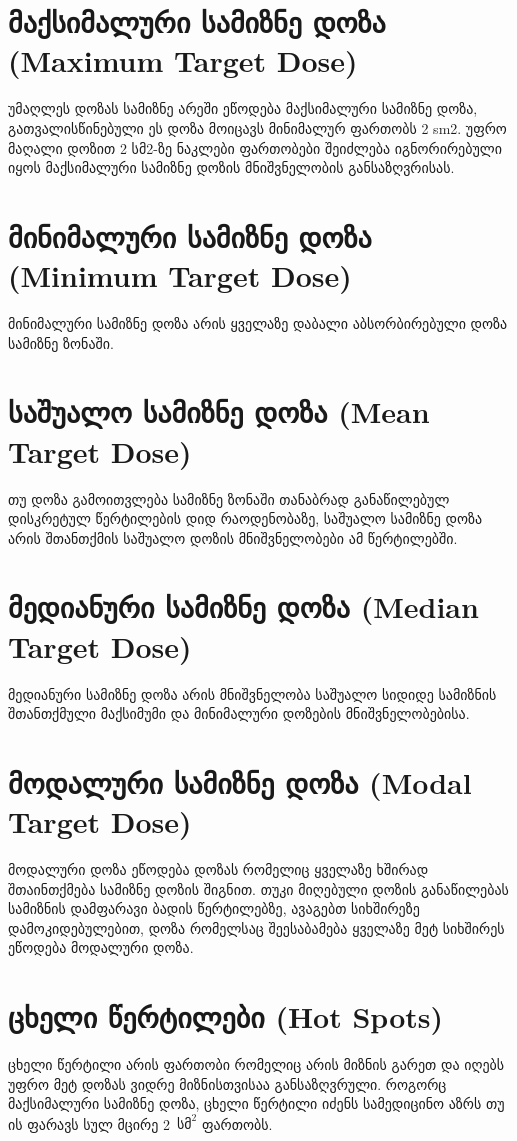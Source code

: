 \documentclass[12pt,a4paper,]{report}
\begin{document}
\section{მაქსიმალური სამიზნე დოზა (Maximum Target Dose)}
უმაღლეს დოზას სამიზნე არეში ეწოდება მაქსიმალური სამიზნე დოზა, გათვალისწინებული ეს დოზა მოიცავს მინიმალურ ფართობს 2 sm2. უფრო მაღალი დოზით 2 სმ2-ზე ნაკლები ფართობები შეიძლება იგნორირებული იყოს მაქსიმალური სამიზნე დოზის მნიშვნელობის განსაზღვრისას.

\section{მინიმალური სამიზნე დოზა (Minimum Target Dose)}
მინიმალური სამიზნე დოზა არის ყველაზე დაბალი აბსორბირებული დოზა სამიზნე ზონაში. 

\section{საშუალო სამიზნე დოზა (Mean Target Dose)}
თუ დოზა გამოითვლება სამიზნე ზონაში თანაბრად განაწილებულ დისკრეტულ წერტილების დიდ რაოდენობაზე, საშუალო სამიზნე დოზა არის შთანთქმის საშუალო დოზის მნიშვნელობები ამ წერტილებში. 

\section{მედიანური სამიზნე დოზა (Median Target Dose)}
მედიანური სამიზნე დოზა არის მნიშვნელობა საშუალო სიდიდე სამიზნის შთანთქმული მაქსიმუმი და მინიმალური დოზების მნიშვნელობებისა.

\section{მოდალური სამიზნე დოზა (Modal Target Dose)}
მოდალური დოზა ეწოდება დოზას რომელიც ყველაზე ხშირად შთაინთქმება სამიზნე დოზის შიგნით. თუკი მიღებული დოზის განაწილებას სამიზნის დამფარავი ბადის წერტილებზე, ავაგებთ სიხშირეზე დამოკიდებულებით, დოზა რომელსაც შეესაბამება ყველაზე მეტ სიხშირეს ეწოდება მოდალური დოზა.

\section{ცხელი წერტილები (Hot Spots)}
ცხელი წერტილი არის ფართობი რომელიც არის მიზნის გარეთ და იღებს უფრო მეტ დოზას ვიდრე მიზნისთვისაა განსაზღვრული. როგორც მაქსიმალური სამიზნე დოზა, ცხელი წერტილი იძენს სამედიცინო აზრს თუ ის ფარავს სულ მცირე 2~$\text{სმ}^2$ ფართობს.
\end{document}
